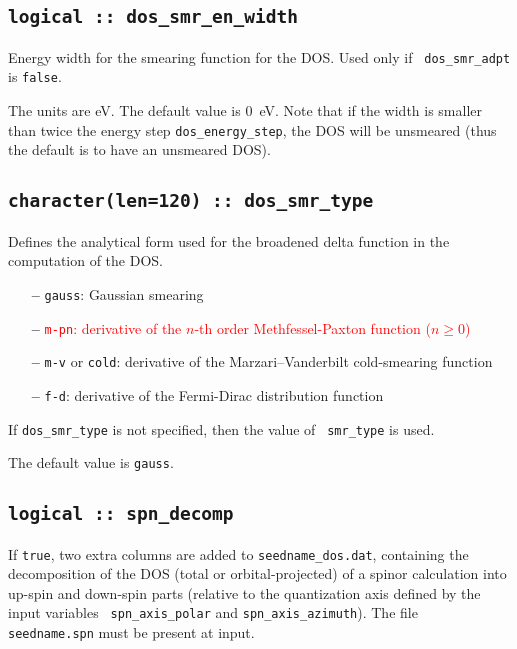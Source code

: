 \subsection[dos\_smr\_en\_width]{\tt logical :: dos\_smr\_en\_width}
Energy width for the smearing function for the DOS. Used only if {\tt
  dos\_smr\_adpt} is \verb#false#.

The units are eV. The default value is 0~eV. Note that if the width is
smaller than twice the energy step {\tt dos\_energy\_step}, the DOS
will be unsmeared (thus the default is to have an unsmeared DOS).


\subsection[dos\_smr\_type]{\tt  character(len=120) :: dos\_smr\_type}

Defines the analytical form used for the broadened delta function in
the computation of the DOS.

\begin{itemize}
  
\item[{\bf --}]
  {\tt gauss}: Gaussian smearing

\item[{\bf --}]
  \textcolor{red}{{\tt m-pn}: derivative of the $n$-th order
    Methfessel-Paxton function ($n\geq 0$)}

\item[{\bf --}]
  {\tt m-v} or {\tt cold}: derivative of the Marzari--Vanderbilt cold-smearing function

\item[{\bf --}]
  {\tt f-d}: derivative of the Fermi-Dirac distribution function

\end{itemize}

If {\tt dos\_smr\_type} is not specified, then the value of {\tt
  smr\_type} is used.  

The default value is {\tt gauss}.

\subsection[spn\_decomp]{\tt logical :: spn\_decomp}
If {\tt true}, two extra columns are added to {\tt seedname\_dos.dat},
containing the decomposition of the DOS (total or orbital-projected)
of a spinor calculation into up-spin and down-spin parts (relative to
the quantization axis defined by the input variables {\tt
  spn\_axis\_polar} and {\tt spn\_axis\_azimuth}). The file {\tt
  seedname.spn} must be present at input.

